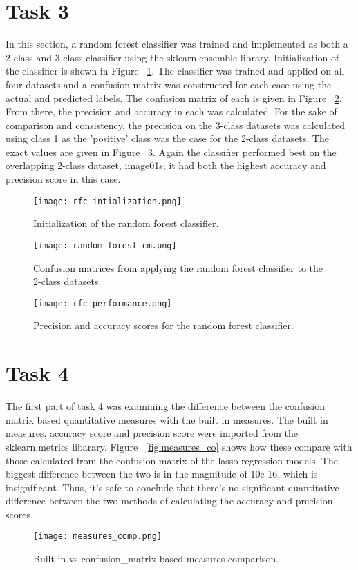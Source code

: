 \documentclass[sigconf]{acmart}
\begin{document}
\section{Task 3}
In this section, a random forest classifier was trained and implemented as both a 2-class and 3-class classifier using the sklearn.ensemble library. Initialization of the classifier is shown in Figure ~\ref{fig:rfc_initalization}. 
The classifier was trained and applied on all four datasets and a confusion matrix was constructed for each case using the actual and predicted labels. The confusion matrix of each is given in Figure ~\ref{fig:rfc_cm}. 
From there, the precision and accuracy in each was calculated. For the sake of comparison and consistency, the precision on the 3-class datasets was calculated using class 1 as the 'positive' class was the case for the 2-class datasets. The exact values are given in Figure ~\ref{fig:rfc_performance}. Again the classifier performed best on the overlapping 2-class dataset, image01s; it had both the highest accuracy and precision score in this case.

\begin{figure}[h]
 \centering
    \texttt{[image: rfc\_intialization.png]}
    \caption{Initialization of the random forest classifier.}
     \label{fig:rfc_initalization}
\end{figure}
\begin{figure}[h]
 \centering
    \texttt{[image: random\_forest\_cm.png]}
    \caption{Confusion matrices from applying the random forest classifier to the 2-class datasets.}
     \label{fig:rfc_cm}
\end{figure}
\begin{figure}[h]
 \centering
    \texttt{[image: rfc\_performance.png]}
    \caption{Precision and accuracy scores for the random forest classifier.}
     \label{fig:rfc_performance}
\end{figure}

\section{Task 4}
The first part of task 4 was examining the difference between the confusion matrix based quantitative measures with the built in measures. The built in measures, accuracy score and precision score were imported from the sklearn.metrics libarary. Figure ~\ref{fig:measures_co} shows how these compare with those calculated from the confusion matrix of the lasso regression models. The biggest difference between the two is in the magnitude of 10e-16, which is insignificant. Thus, it's safe to conclude that there's no significant quantitative difference between the two methods of calculating the accuracy and precision scores.
\begin{figure}[h]
 \centering
    \texttt{[image: measures\_comp.png]}
    \caption{Built-in vs confusion_matrix based measures comparison.}
     \label{fig:measures_comp}
\end{figure}
\end{document}
